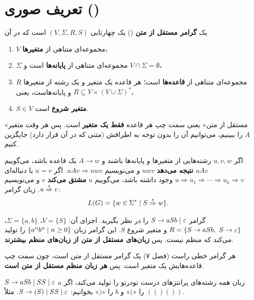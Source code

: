 \section{تعریف صوری ()}

\begin{definition}
یک \textbf{گرامر مستقل از متن} () یک چهارتایی $(V,\Sigma,R,S)$ است که در آن
\begin{enumerate}
\item $V$ مجموعه‌ای متناهی از \textbf{متغیرها}،
\item $\Sigma$ مجموعه‌ای متناهی از \textbf{پایانه‌ها} است و $V\cap\Sigma=\emptyset$،
\item $R$ مجموعه‌ای متناهی از \textbf{قاعده‌ها} است؛ هر قاعده یک متغیر و یک رشته از متغیرها و پایانه‌هاست، یعنی $R\subseteq V\times(V\cup\Sigma)^*$،
\item $S\in V$ \textbf{متغیر شروع} است.
\end{enumerate}
\end{definition}

«مستقل از متن» یعنی سمت چپ هر قاعده \textbf{فقط یک متغیر} است. پس هر وقت متغیر $A$ را ببینیم، می‌توانیم آن را بدون توجه به اطرافش (متنی که در آن قرار دارد) جایگزین کنیم.

\begin{definition}
اگر $u,v,w$ رشته‌هایی از متغیرها و پایانه‌ها باشند و $A\to w$ یک قاعده باشد، می‌گوییم $uAv$ \textbf{نتیجه می‌دهد} $uwv$ و می‌نویسیم $uAv\Rightarrow uwv$. اگر $u=v$ یا دنباله‌ای $u\Rightarrow u_1\Rightarrow\cdots\Rightarrow u_k\Rightarrow v$ وجود داشته باشد، می‌گوییم $u$ \textbf{مشتق می‌کند} $v$ و می‌نویسیم $u\overset{*}{\Rightarrow} v$. زبان گرامر:
\[L(G)=\{w\in\Sigma^*\mid S\overset{*}{\Rightarrow} w\}.\]
\end{definition}

\begin{example}
گرامر $S\to aSb\mid\varepsilon$ را در نظر بگیرید. اجزای آن: $V=\{S\}$، $\Sigma=\{a,b\}$، $R=\{S\to aSb,\ S\to\varepsilon\}$ و متغیر شروع $S$. این گرامر زبان $\{a^nb^n\mid n\ge0\}$ را تولید می‌کند که منظم نیست. پس \textbf{زبان‌های مستقل از متن از زبان‌های منظم بیشترند}.
\end{example}

\begin{note}
هر گرامر خطی راست (فصل ۷) یک گرامر مستقل از متن است، چون سمت چپ قاعده‌هایش یک متغیر است. پس \textbf{هر زبان منظم مستقل از متن است}.
\end{note}

\begin{example}
$S\to aSb\mid SS\mid\varepsilon$ زبان همه رشته‌های پرانتزهای درست تودرتو را تولید می‌کند، اگر $a$ را «$($» و $b$ را «$)$» بخوانیم: $S\to(S)\mid SS\mid\varepsilon$. مثلاً $(()())$.
\end{example}

